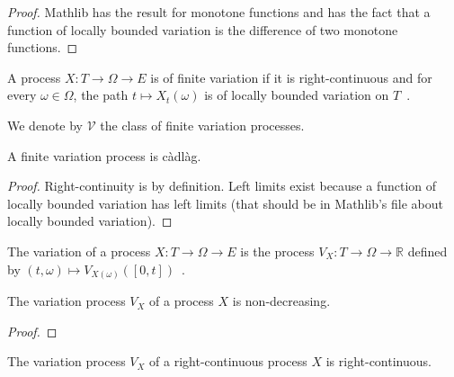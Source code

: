 \begin{proof}
Mathlib has the result for monotone functions and has the fact that a function of locally bounded variation is the difference of two monotone functions.
\end{proof}


\begin{definition}\label{def:HasFiniteVariation}
A process $X : T \to \Omega \to E$ is of finite variation if it is right-continuous and for every $\omega \in \Omega$, the path $t \mapsto X_t(\omega)$ is of locally bounded variation on $T$~.

We denote by $\mathcal{V}$ the class of finite variation processes.
\end{definition}


\begin{lemma}\label{lem:HasFiniteVariation.isCadlag}
A finite variation process is càdlàg.
\end{lemma}

\begin{proof}
Right-continuity is by definition. Left limits exist because a function of locally bounded variation has left limits (that should be in Mathlib's file about locally bounded variation).
\end{proof}


\begin{definition}\label{def:variationProcess}
The variation of a process $X : T \to \Omega \to E$ is the process $V_X : T \to \Omega \to \mathbb{R}$ defined by $(t, \omega) \mapsto V_{X(\omega)}([0,t])$~.
\end{definition}


\begin{lemma}\label{lem:monotone_variationProcess}
The variation process $V_X$ of a process $X$ is non-decreasing.
\end{lemma}

\begin{proof}

\end{proof}


\begin{lemma}\label{lem:rightContinuous_variationProcess}
The variation process $V_X$ of a right-continuous process $X$ is right-continuous.
\end{lemma}

